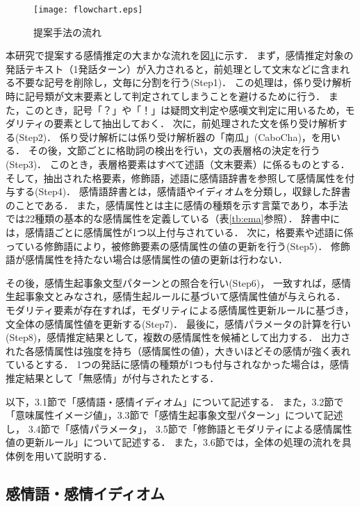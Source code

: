 \documentclass[japanese]{jnlp_1.3c}
\begin{document}
\begin{figure}[b]
\begin{center}
    \texttt{[image: flowchart.eps]}
\caption{提案手法の流れ}
\label{fig:flow}
\end{center}
\end{figure}


本研究で提案する感情推定の大まかな流れを図\ref{fig:flow}に示す．
まず，感情推定対象の発話テキスト（1発話ターン）が入力されると，前処理として文末などに含まれる不要な記号を削除し，文毎に分割を行う(Step1)．
この処理は，係り受け解析時に記号類が文末要素として判定されてしまうことを避けるために行う．
また，このとき，記号「？」や「！」は疑問文判定や感嘆文判定に用いるため，モダリティの要素として抽出しておく．
次に，前処理された文を係り受け解析する(Step2)．
    係り受け解析には係り受け解析器の「南瓜」(CaboCha)，\cite{cabocha2}を用いる．
その後，文節ごとに格助詞の検出を行い，文の表層格の決定を行う(Step3)．
このとき，表層格要素はすべて述語（文末要素）に係るものとする．
そして，抽出された格要素，修飾語，述語に感情語辞書を参照して感情属性を付与する(Step4)．
感情語辞書とは，感情語やイディオムを分類し，収録した辞書のことである．
また，感情属性とは主に感情の種類を示す言葉であり，本手法では22種類の基本的な感情属性を定義している（表\ref{tb:ema}参照）．
辞書中には，感情語ごとに感情属性が1つ以上付与されている．
次に，格要素や述語に係っている修飾語により，被修飾要素の感情属性の値の更新を行う(Step5)．
修飾語が感情属性を持たない場合は感情属性の値の更新は行わない．

その後，感情生起事象文型パターンとの照合を行い(Step6)，
一致すれば，感情生起事象文とみなされ，感情生起ルールに基づいて感情属性値が与えられる．
モダリティ要素が存在すれば，モダリティによる感情属性更新ルールに基づき，文全体の感情属性値を更新する(Step7)．
最後に，感情パラメータの計算を行い(Step8)，感情推定結果として，複数の感情属性を候補として出力する．
出力された各感情属性は強度を持ち（感情属性の値），大きいほどその感情が強く表れているとする．
1つの発話に感情の種類が1つも付与されなかった場合は，感情推定結果として「無感情」が付与されたとする．

以下，3.1節で「感情語・感情イディオム」について記述する．
また，3.2節で「意味属性イメージ値」，3.3節で「感情生起事象文型パターン」について記述し，
3.4節で「感情パラメータ」，
3.5節で「修飾語とモダリティによる感情属性値の更新ルール」について記述する．
また，3.6節では，全体の処理の流れを具体例を用いて説明する．
\subsection{感情語・感情イディオム}
\end{document}
